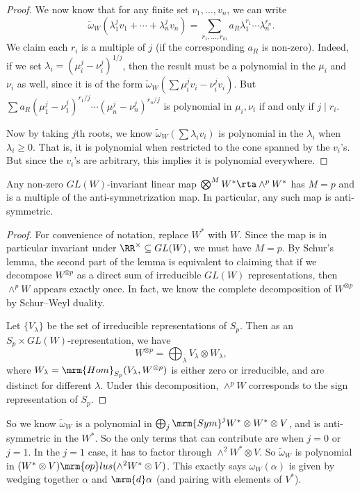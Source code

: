 \begin{proof}
  We now know that for any finite set $v_1, \ldots, v_n$, we can write
  \[
    \tilde{\omega}_W(\lambda_1^j v_1 + \cdots + \lambda_n^j v_n) = \sum_{r_1, \ldots, r_m} a_R \lambda_1^{r_1} \cdots \lambda_n^{r_n}.
  \]
  We claim each $r_i$ is a multiple of $j$ (if the corresponding $a_R$ is non-zero). Indeed, if we set $\lambda_i = (\mu_i^j - \nu_i^j)^{1/j}$, then the result must be a polynomial in the $\mu_i$ and $\nu_i$ as well, since it is of the form $\tilde{\omega}_W(\sum \mu_i^j v_i - \nu_i^j v_i)$. But $\sum a_R (\mu_1^j - \nu_1^j)^{r_1/ j} \cdots (\mu_n^j - \nu_n^j)^{r_n/ j}$ is polynomial in $\mu_i, \nu_i$ if and only if $j \mid r_i$.

  Now by taking $j$th roots, we know $\tilde{\omega}_W(\sum \lambda_i v_i)$ is polynomial in the $\lambda_i$ when $\lambda_i \geq 0$. That is, it is polynomial when restricted to the cone spanned by the $v_i$'s. But since the $v_i$'s are arbitrary, this implies it is polynomial everywhere.
\end{proof}

\begin{lem}
  Any non-zero $ GL (W)$-invariant linear map $\bigotimes^M W^* \rta \wedge^p W^*$ has $M = p$ and is a multiple of the anti-symmetrization map. In particular, any such map is anti-symmetric.
\end{lem}

\begin{proof}
  For convenience of notation, replace $W^*$ with $W$. Since the map is in particular invariant under $\RR^\times \subseteq  GL (W)$, we must have $M = p$. By Schur's lemma, the second part of the lemma is equivalent to claiming that if we decompose $W^{\otimes p}$ as a direct sum of irreducible $ GL (W)$ representations, then $\wedge^p W$ appears exactly once. In fact, we know the complete decomposition of $W^{\otimes p}$ by Schur--Weyl duality.

  Let $\{V_\lambda\}$ be the set of irreducible representations of $S_p$. Then as an $S_p \times  GL (W)$-representation, we have
  \[
    W^{\otimes p} = \bigoplus_\lambda V_\lambda \otimes W_\lambda,
  \]
  where $W_\lambda = \mrm{Hom}_{S_p} (V_\lambda, W^{\otimes p})$ is either zero or irreducible, and are distinct for different $\lambda$. Under this decomposition, $\wedge^p W$ corresponds to the sign representation of $S_p$.
\end{proof}

So we know $\tilde{\omega}_W$ is a polynomial in $\bigoplus_j \mrm{Sym}^j W^* \otimes W^* \otimes V$, and is anti-symmetric in the $W^*$. So the only terms that can contribute are when $j = 0$ or $j = 1$. In the $j = 1$ case, it has to factor through $\wedge^2 W^* \otimes V$. So $\tilde{\omega}_W$ is polynomial in $(W^* \otimes V) \mrm{op}lus (\wedge^2 W^* \otimes V)$. This exactly says $\omega_W(\alpha)$ is given by wedging together $\alpha$ and $\mrm{d} \alpha$ (and pairing with elements of $V^*$).